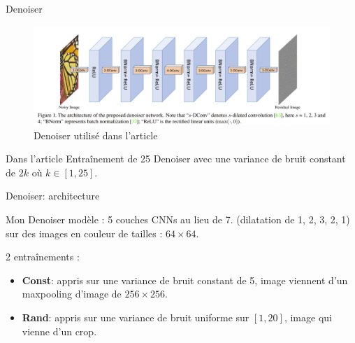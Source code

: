 \documentclass[11pt]{beamer}
\begin{document}
\begin{frame}{Denoiser}
    \begin{figure}
        \centering
        \includegraphics[width=\textwidth]{../paper/model.png}
        \caption{Denoiser utilisé dans l'article}
    \end{figure}
    \begin{block}{Dans l'article}
        Entraînement de 25 Denoiser avec une variance de bruit constant de $2k$ où $k\in [1, 25]$.
    \end{block}
\end{frame}

\begin{frame}{Denoiser: architecture}
    \begin{block}{Mon Denoiser}
        modèle : 5 couches CNNs au lieu de 7. (dilatation de 1, 2, 3, 2, 1) sur des images en 
        couleur de tailles : $64 \times 64$.

        2 entraînements : 
        \begin{itemize}
            \item \textbf{Const}: appris sur une variance de bruit constant de 5,
            image viennent d'un maxpooling d'image de $256 \times 256$. \\

            \item \textbf{Rand}: appris sur une variance de bruit uniforme sur $[1, 20]$, 
            image qui vienne d'un crop.
        \end{itemize}
    \end{block}
\end{frame}
\end{document}
